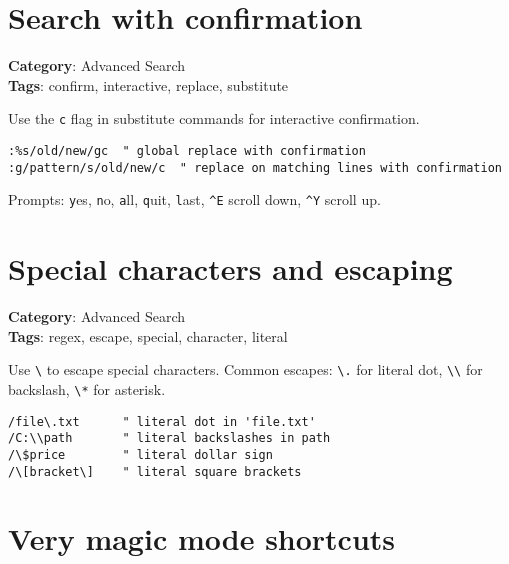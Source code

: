 {\section{Search with confirmation}

\textbf{Category}: Advanced Search\\ \textbf{Tags}: confirm, interactive, replace, substitute
\vspace{0.5cm}

Use the {\footnotesize \Verb§c§} flag in substitute commands for interactive confirmation.

\begin{Exa*}{}
\begin{Verbatim}[fontsize=\footnotesize, breaklines, breakanywhere]
:%s/old/new/gc  " global replace with confirmation
:g/pattern/s/old/new/c  " replace on matching lines with confirmation
\end{Verbatim}
\end{Exa*}

Prompts: {\footnotesize \Verb§y§}es, {\footnotesize \Verb§n§}o, {\footnotesize \Verb§a§}ll, {\footnotesize \Verb§q§}uit, {\footnotesize \Verb§l§}ast, {\footnotesize \Verb§^E§} scroll down, {\footnotesize \Verb§^Y§} scroll up.

\section{Special characters and escaping}

\textbf{Category}: Advanced Search\\ \textbf{Tags}: regex, escape, special, character, literal
\vspace{0.5cm}

Use {\footnotesize \Verb§\§} to escape special characters. Common escapes: {\footnotesize \Verb§\.§} for literal dot, {\footnotesize \Verb§\\§} for backslash, {\footnotesize \Verb§\*§} for asterisk.

\begin{Exa*}{}
\begin{Verbatim}[fontsize=\footnotesize, breaklines, breakanywhere]
/file\.txt      " literal dot in 'file.txt'
/C:\\path       " literal backslashes in path
/\$price        " literal dollar sign
/\[bracket\]    " literal square brackets
\end{Verbatim}
\end{Exa*}

\section{Very magic mode shortcuts}

}
